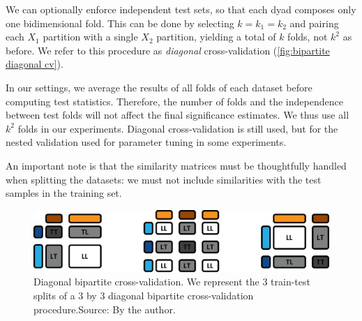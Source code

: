 We can optionally enforce independent test sets, so that each dyad composes only one bidimensional fold. This can be done by selecting $k=k_1=k_2$ and pairing each $X_1$ partition with a single $X_2$ partition, yielding a total of $k$ folds, not $k^2$ as before.
We refer to this procedure as \emph{diagonal} cross-validation (\autoref{fig:bipartite diagonal cv}).

In our settings, we average the results of all folds of each dataset before computing test statistics. Therefore, the number of folds and the independence between test folds will not affect the final significance estimates. We thus use all $k^2$ folds in our experiments. Diagonal cross-validation is still used, but for the nested validation used for parameter tuning in some experiments.

An important note is that the similarity matrices must be thoughtfully handled when splitting the datasets: we must not include similarities with the test samples in the training set.  %

\begin{figure}[tb]
    \centering
    \includegraphics[width=\textwidth]{figures/diagonal_cv.pdf}
    \caption{Diagonal bipartite cross-validation. We represent the 3 train-test splits of a 3 by 3 diagonal bipartite cross-validation procedure.\newline Source: By the author.}
    \label{fig:bipartite diagonal cv}
\end{figure}



